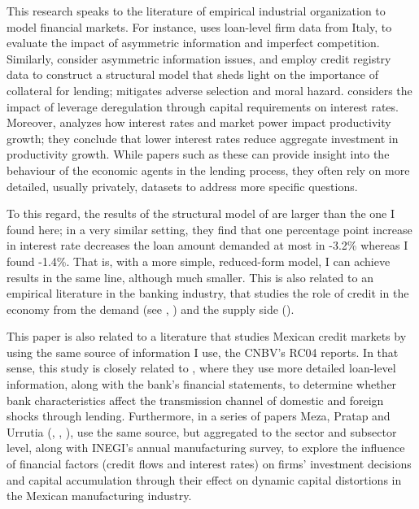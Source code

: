 \documentclass[11pt, oneside]{book}
\begin{document}
This research speaks to the literature of empirical industrial organization to model financial markets. For instance,  \cite{crawford2018asymmetric} uses loan-level firm data from Italy, to evaluate the impact of asymmetric information and imperfect competition. Similarly, \cite{IOANNIDOU202293} consider asymmetric information issues, and employ credit registry data to construct a structural model that sheds light on the importance of collateral for lending; mitigates adverse selection and moral hazard. \cite{benetton2021leverage} considers the impact of leverage deregulation through capital requirements on interest rates. Moreover, \cite{liu2022low} analyzes how interest rates and market power impact productivity growth; they conclude that lower interest rates reduce aggregate investment in productivity growth. While papers such as these can provide insight into the behaviour of the economic agents in the lending process, they often rely on more detailed, usually privately, datasets to address more specific questions.  

To this regard, the results of the structural model of \cite{IOANNIDOU202293} are larger than the one I found here; in a very similar setting, they find that one percentage point increase in interest rate decreases the loan amount demanded at most in  -3.2\% whereas I found -1.4\%. That is, with a more simple, reduced-form model, I can achieve results in the same line, although much smaller. %
This is also related to an empirical literature in the banking industry, that studies the role of credit in the economy from the demand (see \cite{dick2008demand}, \cite{beck2012gets}) and the supply side (\cite{branzoli2021role}).

This paper is also related to a literature that studies Mexican credit markets by using the same source of information I use, the CNBV's RC04 reports. In that sense, this study is closely related to \cite{cantu2020loan}, where they use more detailed loan-level information, along with the bank's financial statements, to determine whether bank characteristics affect the transmission channel of domestic and foreign shocks through lending. Furthermore, in a series of papers Meza, Pratap and Urrutia (\cite{meza2018credit}, \cite{meza2019credit}, \cite{meza2020credit}), use the same source, but aggregated to the sector and subsector level, along with INEGI's annual manufacturing survey, to explore the influence of financial factors (credit flows and interest rates) on firms’ investment decisions and capital accumulation through their effect on dynamic capital distortions in the Mexican manufacturing industry. 
\end{document}
